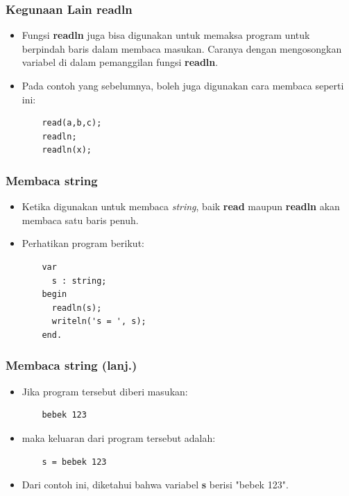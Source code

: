 \begin{frame}[fragile]
\frametitle{Kegunaan Lain readln}
\begin{itemize}
  \item Fungsi \textbf{readln} juga bisa digunakan untuk memaksa program untuk berpindah baris dalam membaca masukan. Caranya dengan mengosongkan variabel di dalam pemanggilan fungsi \textbf{readln}.
  \item Pada contoh yang sebelumnya, boleh juga digunakan cara membaca seperti ini:
  \begin{lstlisting}
    read(a,b,c);
    readln;
    readln(x);
  \end{lstlisting}
\end{itemize}
\end{frame}

\begin{frame}[fragile]
\frametitle{Membaca string}
\begin{itemize}
  \item Ketika digunakan untuk membaca \textit{string}, baik \textbf{read} maupun \textbf{readln} akan membaca satu baris penuh.
  \item Perhatikan program berikut:
  \begin{lstlisting}
    var
      s : string;
    begin
      readln(s);
      writeln('s = ', s);
    end.
  \end{lstlisting}
\end{itemize}
\end{frame}

\begin{frame}[fragile]
\frametitle{Membaca string (lanj.)}
\begin{itemize}
  \item Jika program tersebut diberi masukan:
  \begin{lstlisting}
    bebek 123
  \end{lstlisting}
  \item maka keluaran dari program tersebut adalah:
  \begin{lstlisting}
    s = bebek 123
  \end{lstlisting}
  \item Dari contoh ini, diketahui bahwa variabel \textbf{s} berisi "bebek 123".
\end{itemize}
\end{frame}

